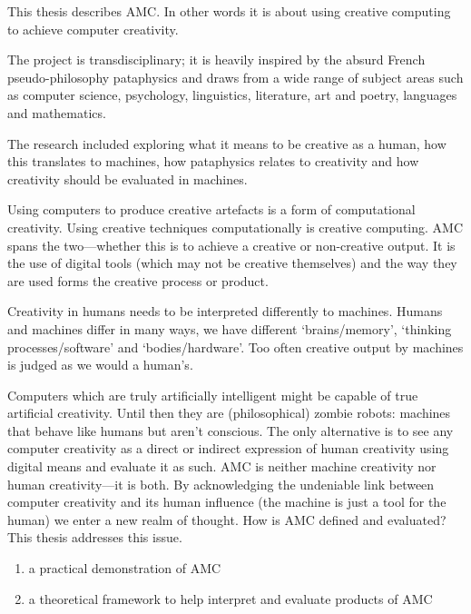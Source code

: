 This thesis describes \acf{AMC}. In other words it is about using creative computing to achieve computer creativity.

The project is transdisciplinary; it is heavily inspired by the absurd French pseudo-philosophy pataphysics and draws from a wide range of subject areas such as computer science, psychology, linguistics, literature, art and poetry, languages and mathematics.

The research included exploring what it means to be creative as a human, how this translates to machines, how pataphysics relates to creativity and how creativity should be evaluated in machines.

Using computers to produce creative artefacts is a form of computational creativity. Using creative techniques computationally is creative computing. \ac{AMC} spans the two---whether this is to achieve a creative or non-creative output. It is the use of digital tools (which may not be creative themselves) and the way they are used forms the creative process or product. 

Creativity in humans needs to be interpreted differently to machines. Humans and machines differ in many ways, we have different `brains/memory', `thinking processes/software' and `bodies/hardware'. Too often creative output by machines is judged as we would a human's. 

Computers which are truly artificially intelligent might be capable of true artificial creativity. Until then they are (philosophical) zombie robots: machines that behave like humans but aren't conscious. The only alternative is to see any computer creativity as a direct or indirect expression of human creativity using digital means and evaluate it as such. \ac{AMC} is neither machine creativity nor human creativity---it is both. By acknowledging the undeniable link between computer creativity and its human influence (the machine is just a tool for the human) we enter a new realm of thought. How is \ac{AMC} defined and evaluated? This thesis addresses this issue. 

\begin{enumerate}
  \item a practical demonstration of \ac{AMC}
  \item a theoretical framework to help interpret and evaluate products of \ac{AMC}
\end{enumerate}

